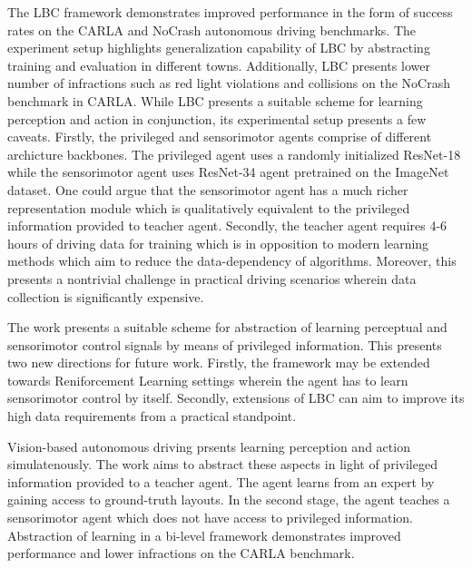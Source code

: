 \documentclass[11pt,letterpaper]{article}
\begin{document}
The LBC framework demonstrates improved performance in the form of success rates on the CARLA and NoCrash autonomous driving benchmarks. The experiment setup highlights generalization capability of LBC by abstracting training and evaluation in different towns. Additionally, LBC presents lower number of infractions such as red light violations and collisions on the NoCrash benchmark in CARLA. While LBC presents a suitable scheme for learning perception and action in conjunction, its experimental setup presents a few caveats. Firstly, the privileged and sensorimotor agents comprise of different archicture backbones. The privileged agent uses a randomly initialized ResNet-18 while the sensorimotor agent uses ResNet-34 agent pretrained on the ImageNet dataset. One could argue that the sensorimotor agent has a much richer representation module which is qualitatively equivalent to the privileged information provided to teacher agent. Secondly, the teacher agent requires 4-6 hours of driving data for training which is in opposition to modern learning methods which aim to reduce the data-dependency of algorithms. Moreover, this presents a nontrivial challenge in practical driving scenarios wherein data collection is significantly expensive. 

The work presents a suitable scheme for abstraction of learning perceptual and sensorimotor control signals by means of privileged information. This presents two new directions for future work. Firstly, the framework may be extended towards Reniforcement Learning settings wherein the agent has to learn sensorimotor control by itself. Secondly, extensions of LBC can aim to improve its high data requirements from a practical standpoint. 

Vision-based autonomous driving prsents learning perception and action simulatenously. The work aims to abstract these aspects in light of privileged information provided to a teacher agent. The agent learns from an expert by gaining access to ground-truth layouts. In the second stage, the agent teaches a sensorimotor agent which does not have access to privileged information. Abstraction of learning in a bi-level framework demonstrates improved performance and lower infractions on the CARLA benchmark. 
\end{document}
